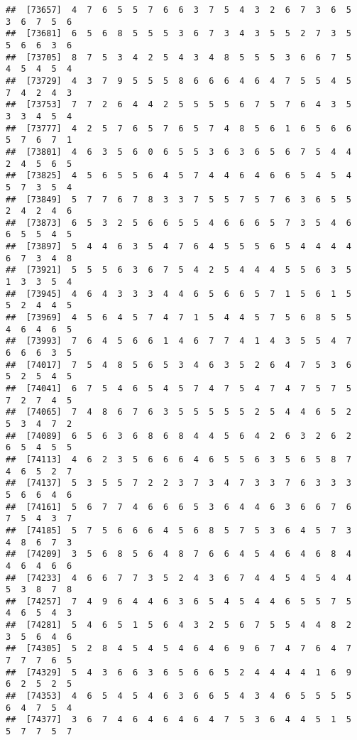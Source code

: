 \documentclass[
]{book}
\begin{document}
\begin{verbatim}
##  [73657]  4  7  6  5  5  7  6  6  3  7  5  4  3  2  6  7  3  6  5  3  6  7  5  6
##  [73681]  6  5  6  8  5  5  5  3  6  7  3  4  3  5  5  2  7  3  5  5  6  6  3  6
##  [73705]  8  7  5  3  4  2  5  4  3  4  8  5  5  5  3  6  6  7  5  4  5  4  5  4
##  [73729]  4  3  7  9  5  5  5  8  6  6  6  4  6  4  7  5  5  4  5  7  4  2  4  3
##  [73753]  7  7  2  6  4  4  2  5  5  5  5  6  7  5  7  6  4  3  5  3  3  4  5  4
##  [73777]  4  2  5  7  6  5  7  6  5  7  4  8  5  6  1  6  5  6  6  5  7  6  7  1
##  [73801]  4  6  3  5  6  0  6  5  5  3  6  3  6  5  6  7  5  4  4  2  4  5  6  5
##  [73825]  4  5  6  5  5  6  4  5  7  4  4  6  4  6  6  5  4  5  4  5  7  3  5  4
##  [73849]  5  7  7  6  7  8  3  3  7  5  5  7  5  7  6  3  6  5  5  2  4  2  4  6
##  [73873]  6  5  3  2  5  6  6  5  5  4  6  6  6  5  7  3  5  4  6  6  5  5  4  5
##  [73897]  5  4  4  6  3  5  4  7  6  4  5  5  5  6  5  4  4  4  4  6  7  3  4  8
##  [73921]  5  5  5  6  3  6  7  5  4  2  5  4  4  4  5  5  6  3  5  1  3  3  5  4
##  [73945]  4  6  4  3  3  3  4  4  6  5  6  6  5  7  1  5  6  1  5  5  2  4  4  5
##  [73969]  4  5  6  4  5  7  4  7  1  5  4  4  5  7  5  6  8  5  5  4  6  4  6  5
##  [73993]  7  6  4  5  6  6  1  4  6  7  7  4  1  4  3  5  5  4  7  6  6  6  3  5
##  [74017]  7  5  4  8  5  6  5  3  4  6  3  5  2  6  4  7  5  3  6  5  2  5  4  5
##  [74041]  6  7  5  4  6  5  4  5  7  4  7  5  4  7  4  7  5  7  5  7  2  7  4  5
##  [74065]  7  4  8  6  7  6  3  5  5  5  5  5  2  5  4  4  6  5  2  5  3  4  7  2
##  [74089]  6  5  6  3  6  8  6  8  4  4  5  6  4  2  6  3  2  6  2  6  5  4  5  5
##  [74113]  4  6  2  3  5  6  6  6  4  6  5  5  6  3  5  6  5  8  7  4  6  5  2  7
##  [74137]  5  3  5  5  7  2  2  3  7  3  4  7  3  3  7  6  3  3  3  5  6  6  4  6
##  [74161]  5  6  7  7  4  6  6  6  5  3  6  4  4  6  3  6  6  7  6  7  5  4  3  7
##  [74185]  5  7  5  6  6  6  4  5  6  8  5  7  5  3  6  4  5  7  3  4  8  6  7  3
##  [74209]  3  5  6  8  5  6  4  8  7  6  6  4  5  4  6  4  6  8  4  4  6  4  6  6
##  [74233]  4  6  6  7  7  3  5  2  4  3  6  7  4  4  5  4  5  4  4  5  3  8  7  8
##  [74257]  7  4  9  6  4  4  6  3  6  5  4  5  4  4  6  5  5  7  5  4  6  5  4  3
##  [74281]  5  4  6  5  1  5  6  4  3  2  5  6  7  5  5  4  4  8  2  3  5  6  4  6
##  [74305]  5  2  8  4  5  4  5  4  6  4  6  9  6  7  4  7  6  4  7  7  7  7  6  5
##  [74329]  5  4  3  6  6  3  6  5  6  6  5  2  4  4  4  4  1  6  9  6  2  5  2  5
##  [74353]  4  6  5  4  5  4  6  3  6  6  5  4  3  4  6  5  5  5  5  6  4  7  5  4
##  [74377]  3  6  7  4  6  4  6  4  6  4  7  5  3  6  4  4  5  1  5  5  7  7  5  7

\end{verbatim}
\end{document}
